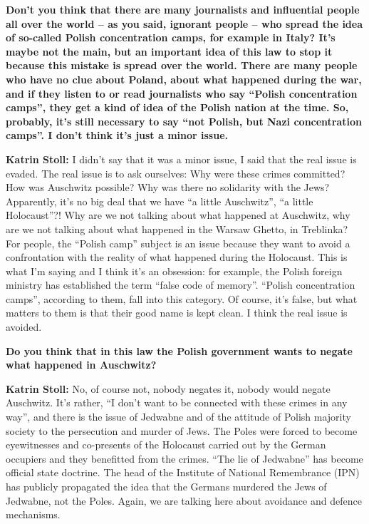 \sloppy
\textbf{Don’t you think that there are many journalists and influential people all over the world – as you said, ignorant people – who spread the idea of so-called Polish concentration camps, for example in Italy? It’s maybe not the main, but an important idea of this law to stop it because this mistake is spread over the world. There are many people who have no clue about Poland, about what happened during the war, and if they listen to or read journalists who say ``Polish concentration camps'', they get a kind of idea of the Polish nation at the time. So, probably, it’s still necessary to say ``not Polish, but Nazi concentration camps''.  I don’t think it’s just a minor issue.} 

\textbf{Katrin Stoll:} I didn’t say that it was a minor issue, I said that the real issue is evaded. The real issue is to ask ourselves: Why were these crimes committed? How was Auschwitz possible? Why was there no solidarity with the Jews? Apparently, it’s no big deal that we have ``a little Auschwitz'', ``a little Holocaust''?! Why are we not talking about what happened at Auschwitz, why are we not talking about what happened in the Warsaw Ghetto, in Treblinka? For people, the ``Polish camp'' subject is an issue because they want to avoid a confrontation with the reality of what happened during the Holocaust. This is what I’m saying and I think it’s an obsession: for example, the Polish foreign ministry has established the term ``false code of memory''. ``Polish concentration camps'', according to them, fall into this category. Of course, it’s false, but what matters to them is that their good name is kept clean. I think the real issue is avoided.

\textbf{Do you think that in this law the Polish government wants to negate what happened in Auschwitz?} 

\textbf{Katrin Stoll:} No, of course not, nobody negates it, nobody would negate Auschwitz. It’s rather, ``I don’t want to be connected with these crimes in any way'', and there is the issue of Jedwabne and of the attitude of Polish majority society to the persecution and murder of Jews. The Poles were forced to become eyewitnesses and co-presents of the Holocaust carried out by the German occupiers and they benefitted from the crimes. ``The lie of Jedwabne'' has become official state doctrine. The head of the Institute of National Remembrance (IPN) has publicly propagated the idea that the Germans murdered the Jews of Jedwabne, not the Poles. Again, we are talking here about avoidance and defence mechanisms. 


